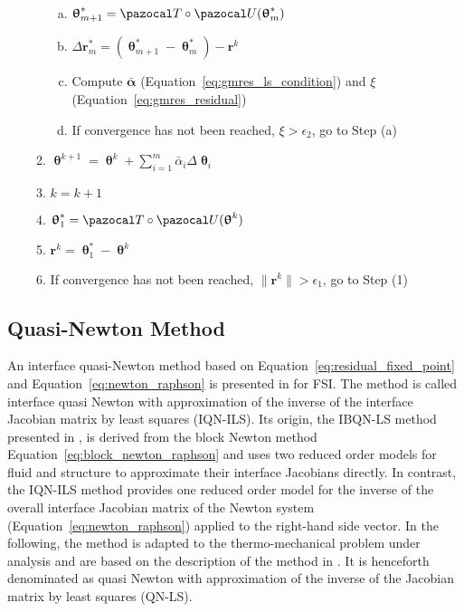 \begin{framedbox}[htbp]
\begin{center}
\begin{minipage}{0.9\textwidth}
\begin{enumerate}[(i)]
\begin{enumerate}[(1)]
\begin{enumerate}[(a)]
        \item \(\bm \uptheta^*_{m+1} = \pazocal T \circ \pazocal U(\bm \uptheta^*_m)\)
        \item \(\Delta \mathbf r^*_m = (\bm\uptheta^*_{m+1} - \bm \uptheta^*_m) - \mathbf r^k\)
        \item Compute \(\bar{\mathbf\alpha}\) (Equation~\eqref{eq:gmres_ls_condition}) and \(\xi\) (Equation~\eqref{eq:gmres_residual})
        \item If convergence has not been reached, \(\xi>\epsilon_2\), go to Step (a)
      \end{enumerate}
    \item \(\bm\uptheta^{k+1} = \bm\uptheta^k + \sum_{i=1}^m \bar{\alpha}_i \Delta\bm\uptheta_i\)
    \item \(k=k+1\)
    \item \(\bm\uptheta^*_1 = \pazocal T\circ \pazocal U(\bm\uptheta^{k})\)
    \item \(\mathbf r^k = \bm\uptheta^*_1 - \bm \uptheta^k\)
    \item If convergence has not been reached, \(\|\mathbf r^k\| > \epsilon_1\), go to Step (1)
    \end{enumerate}
    \end{enumerate}
    \end{minipage}
  \end{center}
\end{framedbox}


\subsection{Quasi-Newton Method}

An interface quasi-Newton method based on Equation~\eqref{eq:residual_fixed_point} and Equation~\eqref{eq:newton_raphson} is presented in \cite{degroote_joris_development_2010} for FSI.
The method is called interface quasi Newton with approximation of the inverse of the interface Jacobian matrix by least squares (IQN-ILS).
Its origin, the IBQN-LS method presented in \cite{vierendeels_implicit_2007}, is derived from the block Newton method Equation~\eqref{eq:block_newton_raphson} and uses two reduced order models for fluid and structure to approximate their interface Jacobians directly.
In contrast, the IQN-ILS method provides one reduced order model for the inverse of the overall interface Jacobian matrix of the Newton system (Equation~\eqref{eq:newton_raphson}) applied to the right-hand side vector.
In the following, the method is adapted to the thermo-mechanical problem under analysis and are based on the description of the method in \cite{gatzhammer_efficient_2014}.
It is henceforth denominated as quasi Newton with approximation of the inverse of the Jacobian matrix by least squares (QN-LS).

